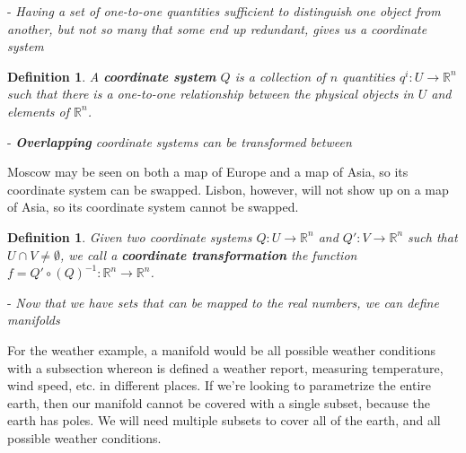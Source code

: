\documentclass{book}
\newtheorem{defn}[equation]{Definition}
\begin{document}
- \emph{Having a set of one-to-one quantities sufficient to distinguish one object from another, but not so many that some end up redundant, gives us a coordinate system}


\begin{defn}
	A \textbf{coordinate system} $Q$ is a collection of $n$ quantities $q^i : U \to \mathbb{R}^n$ such that there is a one-to-one relationship between the physical objects in $U$ and elements of $\mathbb{R}^n$.
\end{defn}


- \emph{\textbf{Overlapping} coordinate systems can be transformed between}

Moscow may be seen on both a map of Europe and a map of Asia, so its coordinate system can be swapped. Lisbon, however, will not show up on a map of Asia, so its coordinate system cannot be swapped. 


\begin{defn}
	Given two coordinate systems  $Q : U \to \mathbb{R}^n$ and $Q' : V \to \mathbb{R}^n$ such that $U \cap V \neq \emptyset$, we call a \textbf{coordinate transformation} the function $f = Q' \circ (Q)^{-1} : \mathbb{R}^n \to \mathbb{R}^n$.
\end{defn}




- \emph{Now that we have sets that can be mapped to the real numbers, we can define manifolds}

For the weather example, a manifold would be all possible weather conditions with a subsection whereon is defined a weather report, measuring temperature, wind speed, etc. in different places. If we're looking to parametrize the entire earth, then our manifold cannot be covered with a single subset, because the earth has poles. We will need multiple subsets to cover all of the earth, and all possible weather conditions. 
\end{document}
